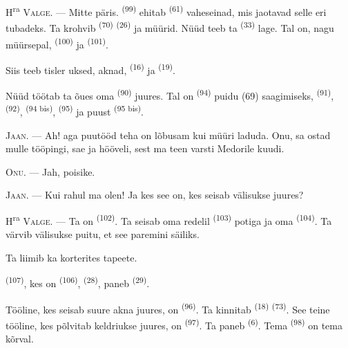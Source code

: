 \VUsaut{3.0mm}
\VUsaut{3.0mm}

H\textsuperscript{ra} \textsc{Valge}. --- Mitte päris. 
\textsuperscript{(99)} ehitab  \textsuperscript{(61)} vaheseinad, mis
jaotavad selle eri tubadeks. Ta krohvib  \textsuperscript{(70)}
 \textsuperscript{(26)} ja müürid. Nüüd teeb ta 
\textsuperscript{(33)} lage. Tal on, nagu müürsepal,  \textsuperscript{(100)}
ja  \textsuperscript{(101)}.

Siis teeb tisler uksed, aknad,  \textsuperscript{(16)} ja
 \textsuperscript{(19)}.

Nüüd töötab ta õues oma  \textsuperscript{(90)} juures. Tal on
 \textsuperscript{(94)} puidu (69) saagimiseks, 
\textsuperscript{(91)},  \textsuperscript{(92)}, 
\textsuperscript{(94 bis)},  \textsuperscript{(95)} ja puust
 \textsuperscript{(95 bis)}.

\textsc{Jaan}. --- Ah! aga puutööd teha on lõbusam kui müüri laduda. Onu, sa ostad
mulle tööpingi, sae ja hööveli, sest ma teen varsti Medorile kuudi.

\textsc{Onu}. --- Jah, poisike.

\textsc{Jaan}. --- Kui rahul ma olen! Ja kes see on, kes seisab välisukse juures?

\VUsaut{3.0mm}
\VUsaut{3.0mm}

H\textsuperscript{ra} \textsc{Valge}. --- Ta on  \textsuperscript{(102)}.
Ta seisab oma redelil  \textsuperscript{(103)} potiga ja oma
 \textsuperscript{(104)}. Ta värvib välisukse puitu, et see paremini
säiliks.

Ta liimib ka korterites tapeete.

 \textsuperscript{(107)}, kes on 
\textsuperscript{(106)},  \textsuperscript{(28)}, paneb 
\textsuperscript{(29)}.

Tööline, kes seisab suure akna juures, on  \textsuperscript{(96)}. Ta
kinnitab  \textsuperscript{(18)}  \textsuperscript{(73)}.
See teine tööline, kes põlvitab keldriukse juures, on 
\textsuperscript{(97)}. Ta paneb  \textsuperscript{(6)}. Tema 
\textsuperscript{(98)} on tema kõrval.

